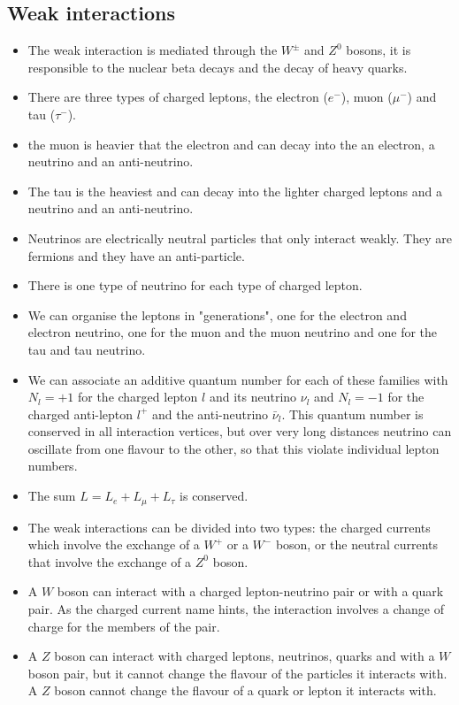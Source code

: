 \documentclass[12pt]{article}
\begin{document}
\subsection{Weak interactions}
\begin{itemize}
\item The weak interaction is mediated through the $W^{\pm}$ and $Z^0$ bosons, it is responsible to the nuclear beta decays and the decay of heavy quarks.
\item There are three types of charged leptons, the electron ($e^-$), muon ($\mu^-$) and tau ($\tau^-$).
\item the muon is heavier that the electron and can decay into the an electron, a neutrino and an anti-neutrino.
\item The tau is the heaviest and can decay into the lighter charged leptons and a neutrino and an anti-neutrino.
\item Neutrinos are electrically neutral particles that only interact weakly. They are fermions and they have an anti-particle.
\item There is one type of neutrino for each type of charged lepton.
\item We can organise the leptons in "generations", one for the electron and electron neutrino, one for the muon and the muon neutrino and one for the tau and tau neutrino. 
\item We can associate an additive quantum number for each of these families with $N_l=+1$ for the charged lepton $l$ and its neutrino $\nu_l$ and $N_l=-1$ for the charged anti-lepton $l^+$ and the anti-neutrino $\bar{\nu}_l$. This quantum number is conserved in all interaction vertices, but over very long distances neutrino can oscillate from one flavour to the other, so that this violate individual lepton numbers.
\item The sum $L=L_e+L_\mu+L_\tau$ is conserved.
\item The weak interactions can be divided into two types: the charged currents which involve the exchange of a $W^+$ or a $W^-$ boson, or the neutral currents that involve the exchange of a $Z^0$ boson.
\item A $W$ boson can interact with a charged lepton-neutrino pair or with a quark pair. As the charged current name hints, the interaction involves a change of charge for the members of the pair.
\item A $Z$ boson can interact with charged leptons, neutrinos, quarks and with a $W$ boson pair, but it cannot change the flavour of the particles it interacts with. A $Z$ boson cannot change the flavour of a quark or lepton it interacts with.

\end{itemize}
\end{document}
